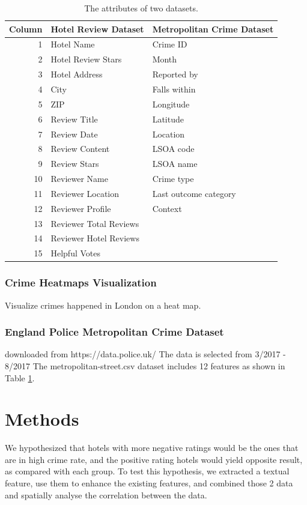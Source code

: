 \documentclass[conference]{IEEEtran}
\begin{document}
\begin{table}[h]
\centering
\caption{The attributes of two datasets.}
\label{tab:attributes}
    \begin{tabular}{r|l|l}
      \textbf{Column} & \textbf{Hotel Review Dataset} & \textbf{Metropolitan Crime Dataset}\\
      \hline
      1 & Hotel Name & Crime ID\\
      2 & Hotel Review Stars & Month\\
      3 & Hotel Address & Reported by\\
      4 & City & Falls within\\
      5 & ZIP & Longitude\\
      6 & Review Title & Latitude\\
      7 & Review Date & Location\\
      8 & Review Content & LSOA code\\
      9 & Review Stars & LSOA name\\
      10 & Reviewer Name & Crime type\\
      11 & Reviewer Location & Last outcome category\\
      12 & Reviewer Profile & Context\\
      13 & Reviewer Total Reviews&\\
      14 & Reviewer Hotel Reviews &\\
      15 & Helpful Votes &\\
    \end{tabular}
\end{table}

\subsubsection{Crime Heatmaps Visualization}
Visualize crimes happened in London on a heat map.

\subsubsection{England Police Metropolitan Crime Dataset}
downloaded from https://data.police.uk/
The data is selected from 3/2017 - 8/2017
The metropolitan-street.csv dataset includes 12 features as shown in Table \ref{tab:attributes}.

\section{Methods}
We hypothesized that hotels with more negative ratings would be the ones that are in high crime rate, and the positive rating hotels would yield opposite result, as compared with each group. To test this hypothesis, we extracted a textual feature, use them to enhance the existing features, and combined those 2 data and spatially analyse the correlation between the data.
\end{document}
